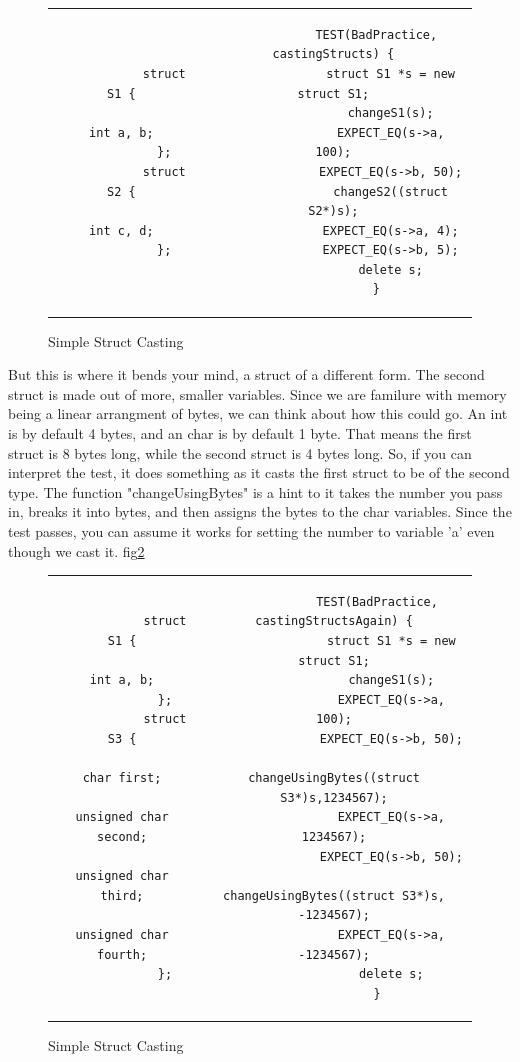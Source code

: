 \documentclass[12pt]{article}
\begin{document}
\begin{figure}[!ht]
	\centering
	\begin{tabular}{c c}
		\begin{minipage}[t]{0.25\textwidth}
		\begin{verbatim}
			struct S1 {
				int a, b;
			};
			struct S2 {
				int c, d;
			};
		\end{verbatim}
		\end{minipage}
		&
		\begin{minipage}[t]{0.6\textwidth}
		\begin{verbatim}
			TEST(BadPractice, castingStructs) {
				struct S1 *s = new struct S1;
				changeS1(s);
				EXPECT_EQ(s->a, 100);
				EXPECT_EQ(s->b, 50);
				changeS2((struct S2*)s);
				EXPECT_EQ(s->a, 4);
				EXPECT_EQ(s->b, 5);
				delete s;
			}
		\end{verbatim}
		\end{minipage}
		\\
	\end{tabular}
	\caption{Simple Struct Casting}
	\label{fig:bad_idea_1}
\end{figure}

But this is where it bends your mind, a struct of a different form.
The second struct is made out of more, smaller variables.
Since we are familure with memory being a linear arrangment of bytes, we can think about how this could go.
An int is by default 4 bytes, and an char is by default 1 byte.
That means the first struct is 8 bytes long, while the second struct is 4 bytes long.
So, if you can interpret the test, it does something as it casts the first struct to be of the second type.
The function "changeUsingBytes" is a hint to it takes the number you pass in, breaks it into bytes, and then assigns the bytes to the char variables.
Since the test passes, you can assume it works for setting the number to variable 'a' even though we cast it.
fig\ref{fig:bad_idea_2}

\begin{figure}[!ht]
	\centering
	\begin{tabular}{c c}
		\begin{minipage}[t]{0.4\textwidth}
		\begin{verbatim}
			struct S1 {
				int a, b;
			};
			struct S3 {
				char first;
				unsigned char second;
				unsigned char third;
				unsigned char fourth;
			};
		\end{verbatim}
		\end{minipage}
		&
		\begin{minipage}[t]{0.72\textwidth}
		\begin{verbatim}
			TEST(BadPractice, castingStructsAgain) {
				struct S1 *s = new struct S1;
				changeS1(s);
				EXPECT_EQ(s->a, 100);
				EXPECT_EQ(s->b, 50);
				changeUsingBytes((struct S3*)s,1234567);
				EXPECT_EQ(s->a, 1234567);
				EXPECT_EQ(s->b, 50);
				changeUsingBytes((struct S3*)s, -1234567);
				EXPECT_EQ(s->a, -1234567);
				delete s;
			}
		\end{verbatim}
		\end{minipage}
		\\
	\end{tabular}
	\caption{Simple Struct Casting}
	\label{fig:bad_idea_2}
\end{figure}
\end{document}
